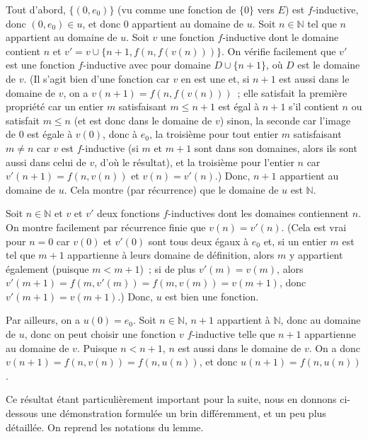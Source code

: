    Tout d'abord, $\lbrace (0,e_0) \rbrace$ (vu comme une fonction de $\lbrace 0 \rbrace$ vers $E$) est $f$-inductive, donc $(0,e_0) \in u$, et donc $0$ appartient au domaine de $u$.
   Soit $n \in \mathbb{N}$ tel que $n$ appartient au domaine de $u$. 
   Soit $v$ une fonction $f$-inductive dont le domaine contient $n$ et $v' = v \cup \lbrace n+1, f(n, f(v(n))) \rbrace$. 
   On vérifie facilement que $v'$ est une fonction $f$-inductive avec pour domaine $D \cup \lbrace n+1 \rbrace$, où $D$ est le domaine de $v$. 
   (Il s'agit bien d'une fonction car $v$ en est une et, si $n+1$ est aussi dans le domaine de $v$, on a $v(n+1) = f(n, f(v(n)))$ ; elle satisfait la première propriété car un entier $m$ satisfaisant $m \leq n+1$ est égal à $n+1$ s'il contient $n$ ou satisfait $m \leq n$ (et est donc dans le domaine de $v$) sinon, la seconde car l'image de $0$ est égale à $v(0)$, donc à $e_0$, la troisième pour tout entier $m$ satisfaisant $m \neq n$ car $v$ est $f$-inductive (si $m$ et $m+1$ sont dans son domaines, alors ils sont aussi dans celui de $v$, d'où le résultat), et la troisième pour l'entier $n$ car $v'(n+1) = f(n,v(n))$ et $v(n) = v'(n)$.)
   Donc, $n+1$ appartient au domaine de $u$. 
   Cela montre (par récurrence) que le domaine de $u$ est $\mathbb{N}$. 

   Soit $n \in \mathbb{N}$ et $v$ et $v'$ deux fonctions $f$-inductives dont les domaines contiennent $n$. 
   On montre facilement par récurrence finie que $v(n) = v'(n)$. 
   (Cela est vrai pour $n=0$ car $v(0)$ et $v'(0)$ sont tous deux égaux à $e_0$ et, si un entier $m$ est tel que $m+1$ appartienne à leurs domaine de définition, alors $m$ y appartient également (puisque $m < m+1$) ; si de plus $v'(m) = v(m)$, alors $v'(m+1) = f(m,v'(m)) = f(m,v(m)) = v(m+1)$, donc $v'(m+1) = v(m+1)$.)
   Donc, $u$ est bien une fonction.

   Par ailleurs, on a $u(0) = e_0$. 
   Soit $n \in \mathbb{N}$, $n+1$ appartient à $\mathbb{N}$, donc au domaine de $u$, donc on peut choisir une fonction $v$ $f$-inductive telle que $n+1$ appartienne au domaine de $v$. 
   Puisque $n < n+1$, $n$ est aussi dans le domaine de $v$. 
   On a donc $v(n+1) = f(n, v(n)) = f(n,u(n))$, et donc $u(n+1) = f(n, u(n))$.

  \done 

\medskip 

Ce résultat étant particulièrement important pour la suite, nous en donnons ci-dessous une démonstration formulée un brin différemment, et un peu plus détaillée. 
On reprend les notations du lemme. 

